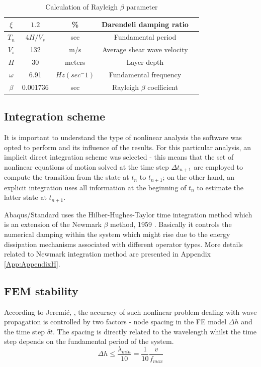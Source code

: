 	\begin{table}[h!]
		\centering
		\begin{tabular}{|c|c|c|c|c|}
			\hline $\xi$         &       $1.2$    &  \%    &  Darendeli damping ratio      \\ 
			\hline $T_n$    & $4H/V_s$ &  sec &  Fundamental period\\ 
			\hline $V_s$  & 132  &  m/s &  Average shear wave velocity\\ 
			\hline $H$ & 30 &  meters &  Layer depth\\
			\hline $\omega$ & 6.91 & $Hz (sec^-1)$ & Fundamental frequency\\
			\hline $\beta$ & 0.001736 & sec & Rayleigh $\beta$ coefficient\\
			\hline
		\end{tabular} 
		\caption{Calculation of Rayleigh $\beta$ parameter}
		\label{beta_param}
	\end{table}
	
	\subsection{Integration scheme}
	It is important to understand the type of nonlinear analysis the software was opted to perform and its influence of the results. For this particular analysis, an implicit direct integration scheme was selected - this means that the set of nonlinear equations of motion solved at the time step $\Delta t_{n+1}$ are employed to compute the transition from the state at $t_n$ to $t_{n+1}$; on the other hand, an explicit integration uses all information at the beginning of $t_n$ to estimate the latter state at $t_{n+1}$.
	
	Abaqus/Standard uses the Hilber-Hughes-Taylor time integration method \cite{hilber1977improved} which is an extension of the Newmark $\beta$ method, 1959 \cite{newmark1959method}. Basically it controls the numerical damping within the system which might rise due to the energy dissipation mechanisms associated with different operator types. More details related to Newmark integration method are presented in Appendix \ref{App:AppendixH}.
	
	\subsection{FEM stability}
	According to Jeremi\'{c}, \cite{jeremic2009time}, the accuracy of such nonlinear problem dealing with wave propagation is controlled by two factors - node spacing in the FE model $\Delta h$ and the time step $\delta t$. The spacing is directly related to the wavelength whilst the time step depends on the fundamental period of the system. 
	\begin{equation}
	\Delta h\leq\frac{\lambda_{min}}{10}=\frac{1}{10} \frac{v}{f_{max}}
	\end{equation}
	
